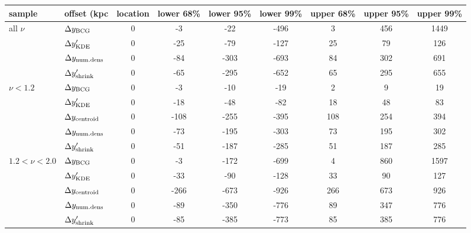 \begin{tabular}{llccccccc}
\toprule
sample & offset (kpc  &  location &  lower 68\% &  lower 95\% &  lower 99\% &  upper 68\% &  upper 95\% &  upper 99\% \\
\midrule
all $\nu$& $\Delta y_{\rm BCG}$                &         0 &          -3 &         -22 &        -496 &           3 &         456 &        1449 \\
& $\Delta y_{\rm KDE}'$               &         0 &         -25 &         -79 &        -127 &          25 &          79 &         126 \\
& $\Delta y_{\rm num. dens}$          &        0 &         -84 &        -303 &        -693 &          84 &         302 &         691 \\
& $\Delta y_{\rm shrink}'$            &        0 &         -65 &        -295 &        -652 &          65 &         295 &         655 \\
\midrule
$\nu < 1.2$& $\Delta y_{\rm BCG}$              &        0 &          -3 &         -10 &         -19 &           2 &           9 &          19 \\
& $\Delta y_{\rm KDE}'$             &         0 &         -18 &         -48 &         -82 &          18 &          48 &          83 \\
& $\Delta y_{\rm centroid}$         &        0 &        -108 &        -255 &        -395 &         108 &         254 &         394 \\
& $\Delta y_{\rm num. dens}$        &        0 &         -73 &        -195 &        -303 &          73 &         195 &         302 \\
& $\Delta y_{\rm shrink}'$          &         0 &         -51 &        -187 &        -285 &          51 &         187 &         285 \\
\midrule
$1.2 < \nu < 2.0$& $\Delta y_{\rm BCG}$        &         0 &          -3 &        -172 &        -699 &           4 &         860 &        1597 \\
& $\Delta y_{\rm KDE}'$       &        0 &         -33 &         -90 &        -128 &          33 &          90 &         127 \\
& $\Delta y_{\rm centroid}$   &         0 &        -266 &        -673 &        -926 &         266 &         673 &         926 \\
& $\Delta y_{\rm num. dens}$  &         0 &         -89 &        -350 &        -776 &          89 &         347 &         776 \\
& $\Delta y_{\rm shrink}'$    &        0 &         -85 &        -385 &        -773 &          85 &         385 &         776 \\
\bottomrule
\end{tabular}
